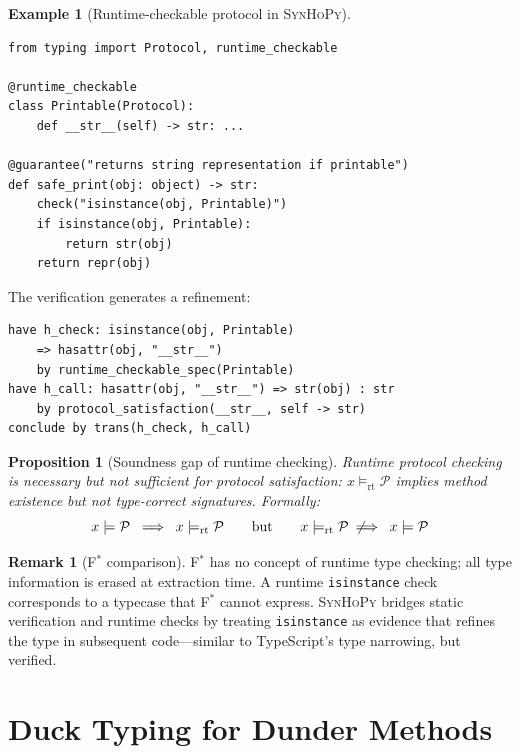 \documentclass[11pt,a4paper]{report}
\theoremstyle{definition}
\newtheorem{example}[definition]{Example}
\newtheorem{remark}[definition]{Remark}
\theoremstyle{plain}
\newtheorem{proposition}[definition]{Proposition}
\newcommand{\fstar}{F$^{*}$}
\newcommand{\synhopy}{\textsc{SynHoPy}}
\begin{document}
\begin{example}[Runtime-checkable protocol in \synhopy{}]
\begin{lstlisting}[style=synhopy]
from typing import Protocol, runtime_checkable

@runtime_checkable
class Printable(Protocol):
    def __str__(self) -> str: ...

@guarantee("returns string representation if printable")
def safe_print(obj: object) -> str:
    check("isinstance(obj, Printable)")
    if isinstance(obj, Printable):
        return str(obj)
    return repr(obj)
\end{lstlisting}

The verification generates a refinement:
\begin{lstlisting}[style=proof]
have h_check: isinstance(obj, Printable)
    => hasattr(obj, "__str__")
    by runtime_checkable_spec(Printable)
have h_call: hasattr(obj, "__str__") => str(obj) : str
    by protocol_satisfaction(__str__, self -> str)
conclude by trans(h_check, h_call)
\end{lstlisting}
\end{example}

\begin{proposition}[Soundness gap of runtime checking]
\label{prop:runtime-gap}
Runtime protocol checking is \emph{necessary but not sufficient} for
protocol satisfaction: $x \models_{\mathrm{rt}} \mathcal{P}$ implies method
existence but not type-correct signatures. Formally:
\[
  x \models \mathcal{P} \;\implies\; x \models_{\mathrm{rt}} \mathcal{P}
  \qquad\text{but}\qquad
  x \models_{\mathrm{rt}} \mathcal{P} \;\not\!\!\implies\; x \models \mathcal{P}
\]
\end{proposition}

\begin{remark}[\fstar{} comparison]
\fstar{} has no concept of runtime type checking; all type information is erased
at extraction time. A runtime \lstinline[style=python]|isinstance| check
corresponds to a typecase that \fstar{} cannot express. \synhopy{} bridges
static verification and runtime checks by treating
\lstinline[style=python]|isinstance| as evidence that refines the type in
subsequent code---similar to TypeScript's type narrowing, but verified.
\end{remark}


\section{Duck Typing for Dunder Methods}
\label{sec:dunder-duck}
\end{document}
